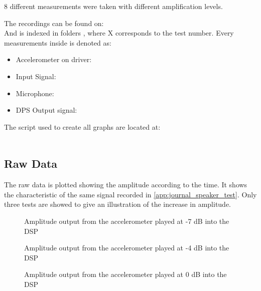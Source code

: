 8 different measurements were taken with different amplification levels.

The recordings can be found on:\\
And is indexed in folders , where X corresponds to the test number. Every measurements inside is denoted as:
\begin{itemize}
\item Accelerometer on driver: 
\item Input Signal: 
\item Microphone: 
\item DPS Output signal: 
\end{itemize}
\vspace*{-5mm}
The script used to create all graphs are located at:\\
\\

\subsection{Raw Data}
The raw data is plotted showing the amplitude according to the time. It shows the characteristic of the same signal recorded in \autoref{app:journal_speaker_test}. Only three tests are showed to give an illustration of the increase in amplitude.
\begin{figure}[H]
	\centering
	
	\caption{Amplitude output from the accelerometer played at -7 dB into the DSP}
	\label{fig:Driver2Test}
\end{figure}

\begin{figure}[H]
	\centering
	
	\caption{Amplitude output from the accelerometer played at -4 dB into the DSP}
	\label{fig:Driver5Test}
\end{figure}


\begin{figure}[H]
	\centering
	
	\caption{Amplitude output from the accelerometer played at 0 dB into the DSP}
	\label{fig:Driver10TestAcc}
\end{figure}


